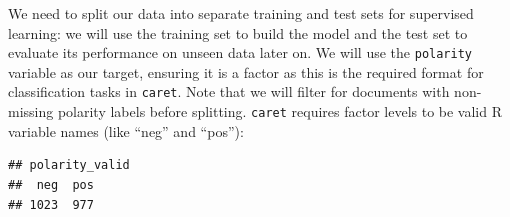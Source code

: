 \documentclass[
]{book}
\newenvironment{Shaded}{\begin{snugshade}}{\end{snugshade}}
\newcommand{\AttributeTok}[1]{\textcolor[rgb]{0.13,0.29,0.53}{#1}}
\newcommand{\CommentTok}[1]{\textcolor[rgb]{0.56,0.35,0.01}{\textit{#1}}}
\newcommand{\FunctionTok}[1]{\textcolor[rgb]{0.13,0.29,0.53}{\textbf{#1}}}
\newcommand{\NormalTok}[1]{#1}
\newcommand{\OtherTok}[1]{\textcolor[rgb]{0.56,0.35,0.01}{#1}}
\newcommand{\SpecialCharTok}[1]{\textcolor[rgb]{0.81,0.36,0.00}{\textbf{#1}}}
\newcommand{\StringTok}[1]{\textcolor[rgb]{0.31,0.60,0.02}{#1}}
\begin{document}
We need to split our data into separate training and test sets for supervised learning: we will use the training set to build the model and the test set to evaluate its performance on unseen data later on. We will use the \texttt{polarity} variable as our target, ensuring it is a factor as this is the required format for classification tasks in \texttt{caret}. Note that we will filter for documents with non-missing polarity labels before splitting. \texttt{caret} requires factor levels to be valid R variable names (like ``neg'' and ``pos''):

\begin{Shaded}
\end{Shaded}

\begin{verbatim}
## polarity_valid
##  neg  pos 
## 1023  977
\end{verbatim}
\end{document}
